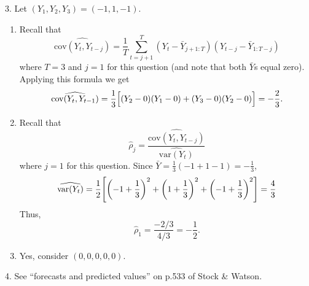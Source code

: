 \documentclass[12pt]{article}
\DeclarePairedDelimiter{\paren}{(}{)}
\DeclarePairedDelimiter{\sqbrac}{[}{]}
\begin{document}
3. Let $(Y_1,Y_2,Y_3)=(-1,1,-1)$.
\begin{enumerate}
  \item Recall that 
  \begin{equation*}
    \widehat{\mathrm{cov}(Y_t,Y_{t-j})}=\frac1T \sum_{t=j+1}^T (Y_t-\bar Y_{j+1:T})(Y_{t-j}-\bar Y_{1:T-j})
  \end{equation*}
  where $T=3$ and $j=1$ for this question (and note that both $\bar Y$s equal zero). 
  Applying this formula we get 
  \begin{equation*}
    \widehat{\mathrm{cov}(Y_t,Y_{t-1})}=\frac13\sqbrac[\Big]{(Y_2-0)(Y_1-0)+(Y_3-0)(Y_2-0)}=-\frac23.
  \end{equation*}
  
  \item Recall that 
  \begin{equation*}
    \hat\rho_j=\frac{\widehat{\mathrm{cov}(Y_t,Y_{t-j})}}{\widehat{\mathrm{var}(Y_t)}}
  \end{equation*}
  where $j=1$ for this question.
  Since $\bar Y=\frac13(-1+1-1)=-\frac13$,
  \begin{equation*}
    \widehat{\mathrm{var}(Y_t)}=\frac12\sqbrac*{\paren*{-1+\frac13}^2+\paren*{1+\frac13}^2+\paren*{-1+\frac13}^2}=\frac43
  \end{equation*}
  Thus,
  \begin{equation*}
    \hat\rho_1=\frac{-2/3}{4/3}=-\frac12.
  \end{equation*}
  
  \item Yes, consider $(0,0,0,0,0)$.
\end{enumerate}



4. See ``forecasts and predicted values'' on p.533 of Stock \& Watson.
\end{document}
